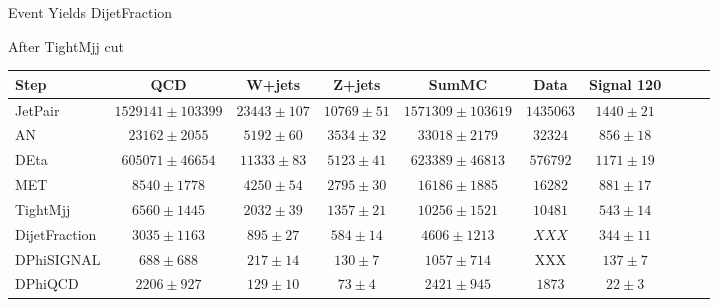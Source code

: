 \documentclass[8pt]{beamer}
\begin{document}
\begin{frame}{Event Yields DijetFraction}

\begin{block}{After TightMjj cut}
  


\begin{tiny}
\begin{center}
  

\hspace*{-1cm}
\begin{tabular}{|l|c|c|c|c|c|c||c|c||c|}
\hline
Step          & QCD                   & W+jets            & Z+jets           & SumMC & Data & Signal 120 \\
\hline
JetPair       & $ 1529141 \pm 103399 $& $ 23443 \pm 107 $ & $ 10769 \pm 51 $ & $ 1571309 \pm 103619 $ & $ 1435063 $ & $ 1440 \pm 21 $ \\ 
AN            & $ 23162 \pm 2055 $    & $ 5192 \pm 60 $   & $ 3534 \pm 32 $  & $ 33018 \pm 2179 $ & $ 32324 $ & $ 856 \pm 18 $ \\ 
DEta          & $ 605071 \pm 46654 $  & $ 11333 \pm 83 $  & $ 5123 \pm 41 $  & $ 623389 \pm 46813 $ & $ 576792 $ & $ 1171 \pm 19 $ \\ 
MET           & $ 8540 \pm 1778 $     & $ 4250 \pm 54 $   & $ 2795 \pm 30 $  & $ 16186 \pm 1885 $ & $ 16282 $ & $ 881 \pm 17 $ \\ 
TightMjj      & $ 6560 \pm 1445 $     & $ 2032 \pm 39 $   & $ 1357 \pm 21 $  & $ 10256 \pm 1521 $ & $ 10481 $ & $ 543 \pm 14 $ \\ 
DijetFraction & $ 3035 \pm 1163 $     & $ 895 \pm 27 $    & $ 584 \pm 14 $   & $ 4606 \pm 1213 $ & $ XXX $ & $ 344 \pm 11 $ \\ 
DPhiSIGNAL    & $ 688 \pm 688 $       & $ 217 \pm 14 $    & $ 130 \pm 7 $    & $ 1057 \pm 714 $ & XXX & $ 137 \pm 7 $ \\ 
DPhiQCD       & $ 2206 \pm 927 $      & $ 129 \pm 10 $    & $ 73 \pm 4 $     & $ 2421 \pm 945 $ & $ 1873 $ & $ 22 \pm 3 $ \\ 
\hline
\end{tabular}
\end{center}

\end{tiny}

\end{block}

\end{frame}
\end{document}
